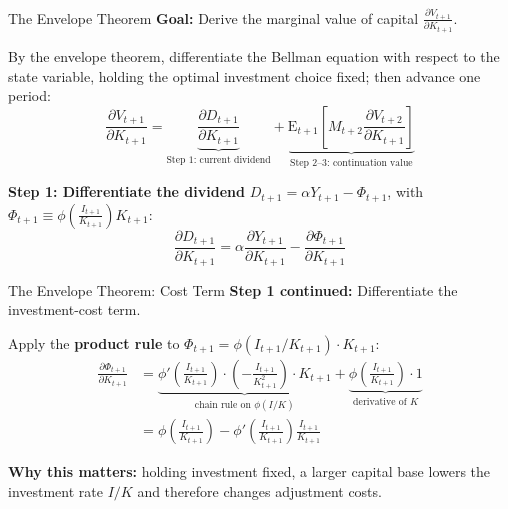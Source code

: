 \documentclass{beamer}
\begin{document}
\begin{frame}{The Envelope Theorem}
    \textbf{Goal:} Derive the marginal value of capital $\frac{\partial V_{t+1}}{\partial K_{t+1}}$.

    By the envelope theorem, differentiate the Bellman equation with respect to the state variable, holding the optimal investment choice fixed; then advance one period:
    \begin{equation}\label{equ:envelope}
        \frac{\partial V_{t+1}}{\partial K_{t+1}} = \underbrace{\frac{\partial D_{t+1}}{\partial K_{t+1}}}_{\text{Step 1: current dividend}} + \underbrace{\mathrm{E}_{t+1}\left[M_{t+2} \frac{\partial V_{t+2}}{\partial K_{t+1}}\right]}_{\text{Step 2--3: continuation value}}
    \end{equation}

    \textbf{Step 1: Differentiate the dividend} $D_{t+1} = \alpha Y_{t+1} - \Phi_{t+1}$, with $\Phi_{t+1} \equiv \phi\!\left(\frac{I_{t+1}}{K_{t+1}}\right) K_{t+1}$:
    \begin{equation*}
        \frac{\partial D_{t+1}}{\partial K_{t+1}} = \alpha \frac{\partial Y_{t+1}}{\partial K_{t+1}} - \frac{\partial \Phi_{t+1}}{\partial K_{t+1}}
    \end{equation*}
\end{frame}

\begin{frame}{The Envelope Theorem: Cost Term}
    \textbf{Step 1 continued:} Differentiate the investment-cost term.
    
    Apply the \textbf{product rule} to $\Phi_{t+1} = \phi(I_{t+1}/K_{t+1}) \cdot K_{t+1}$:
    \begin{equation*}
        \begin{aligned}
            \frac{\partial \Phi_{t+1}}{\partial K_{t+1}} &= \underbrace{\phi'\!\left(\tfrac{I_{t+1}}{K_{t+1}}\right) \cdot \left(-\tfrac{I_{t+1}}{K_{t+1}^2}\right) \cdot K_{t+1}}_{\text{chain rule on } \phi(I/K)} + \underbrace{\phi\!\left(\tfrac{I_{t+1}}{K_{t+1}}\right) \cdot 1}_{\text{derivative of } K} \\
            &= \phi\!\left(\tfrac{I_{t+1}}{K_{t+1}}\right) - \phi'\!\left(\tfrac{I_{t+1}}{K_{t+1}}\right) \tfrac{I_{t+1}}{K_{t+1}}
        \end{aligned}
    \end{equation*}

    \vspace{4pt}
    \textbf{Why this matters:} holding investment fixed, a larger capital base lowers the investment rate $I/K$ and therefore changes adjustment costs.
\end{frame}
\end{document}

